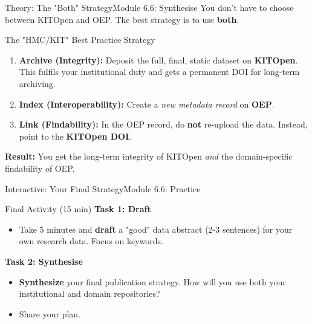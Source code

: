\begin{frame}{Theory: The "Both" Strategy}{Module 6.6: Synthesise}
    You don't have to choose between KITOpen and OEP. The best strategy is to use \textbf{both}.
    
    \begin{block}{The "HMC/KIT" Best Practice Strategy}
        \begin{enumerate}
            \item \textbf{Archive (Integrity):} Deposit the full, final, static dataset on \textbf{KITOpen}. This fulfils your institutional duty and gets a permanent DOI for long-term archiving.
            \pause
            \item \textbf{Index (Interoperability):} Create a \emph{new metadata record} on \textbf{OEP}.
            \pause
            \item \textbf{Link (Findability):} In the OEP record, do \textbf{not} re-upload the data. Instead, point to the \textbf{KITOpen DOI}.
        \end{enumerate}
    \end{block}
    \pause
    \textbf{Result:} You get the long-term integrity of KITOpen \emph{and} the domain-specific findability of OEP.
\end{frame}

\begin{frame}{Interactive: Your Final Strategy}{Module 6.6: Practice}
    \begin{block}{Final Activity (15 min)}
        \textbf{Task 1: Draft}
        \begin{itemize}
            \item Take 5 minutes and \textbf{draft} a "good" data abstract (2-3 sentences) for your own research data. Focus on keywords.
        \end{itemize}
        \pause
        \textbf{Task 2: Synthesise}
        \begin{itemize}
            \item \textbf{Synthesize} your final publication strategy. How will you use both your institutional and domain repositories?
            \item Share your plan.
        \end{itemize}
    \end{block}
\end{frame}


